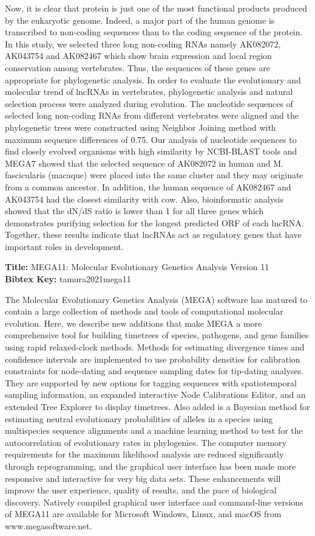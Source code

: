 \documentclass[11pt]{article}
\begin{document}
Now, it is clear that protein is just one of the most functional products
produced by the eukaryotic genome. Indeed, a major part of the human
genome is transcribed to non-coding sequences than to the coding sequence of
the protein. In this study, we selected three long non-coding RNAs namely
AK082072, AK043754 and AK082467 which show brain expression and local
region conservation among vertebrates. Thus, the sequences of these genes
are appropriate for phylogenetic analysis. In order to evaluate the
evolutionary and molecular trend of lncRNAs in vertebrates, phylogenetic
analysis and natural selection process were analyzed during evolution. The
nucleotide sequences of selected long non-coding RNAs from different
vertebrates were aligned and the phylogenetic trees were constructed using
Neighbor Joining method with maximum sequence differences of 0.75. Our
analysis of nucleotide sequences to find closely evolved organisms with high
similarity by NCBI-BLAST tools and MEGA7 showed that the selected
sequence of AK082072 in human and M. fascicularis (macaque) were placed
into the same cluster and they may originate from a common ancestor. In
addition, the human sequence of AK082467 and AK043754 had the closest
similarity with cow. Also, bioinformatic analysis showed that the dN/dS ratio
is lower than 1 for all three genes which demonstrates purifying selection for
the longest predicted ORF of each lncRNA. Together, these results indicate
that lncRNAs act as regulatory genes that have important roles in
development.

\textbf{Title: }MEGA11: Molecular Evolutionary Genetics Analysis Version 11\\
\textbf{Bibtex Key: }tamura2021mega11\\
\cite{tamura2021mega11}

The Molecular Evolutionary Genetics Analysis (MEGA) software has matured to contain a large collection of methods and tools of computational molecular evolution. 
Here, we describe new additions that make MEGA a more comprehensive tool for building timetrees of species, pathogens, and gene families using rapid relaxed-clock methods. 
Methods for estimating divergence times and confidence intervals are implemented to use probability densities for calibration constraints for node-dating and sequence sampling dates for tip-dating analyses. 
They are supported by new options for tagging sequences with spatiotemporal sampling information, an expanded interactive Node Calibrations Editor, and an extended Tree Explorer to display timetrees. 
Also added is a Bayesian method for estimating neutral evolutionary probabilities of alleles in a species using multispecies sequence alignments and a machine learning method to test for the autocorrelation of evolutionary rates in phylogenies. 
The computer memory requirements for the maximum likelihood analysis are reduced significantly through reprogramming, and the graphical user interface has been made more responsive and interactive for very big data sets. 
These enhancements will improve the user experience, quality of results, and the pace of biological discovery. 
Natively compiled graphical user interface and command-line versions of MEGA11 are available for Microsoft Windows, Linux, and macOS from www.megasoftware.net.
\end{document}
